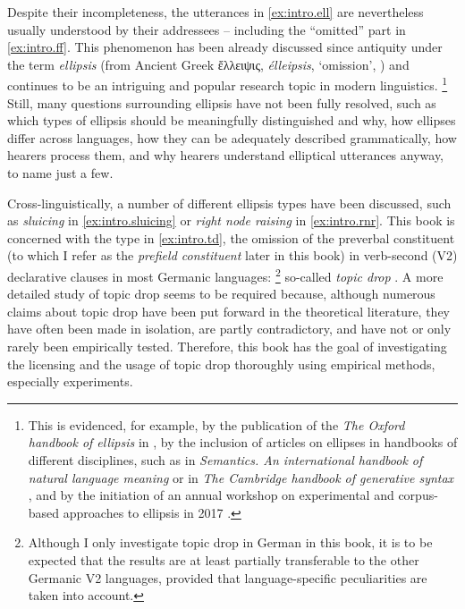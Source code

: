 Despite their incompleteness, the utterances in \ref{ex:intro.ell} are nevertheless usually understood by their addressees -- including the ``omitted'' part in \ref{ex:intro.ff}.
This phenomenon has been already discussed since antiquity under the term \textit{ellipsis} (from Ancient Greek ἔλλειψις, \textit{élleipsis}, `omission', \cite{ellipsis}) and continues to be an intriguing and popular research topic in modern linguistics.%
\footnote{This is evidenced, for example, by the publication of the \textit{The Oxford handbook of ellipsis} in \citeyear{vancraenenbroeck.temmerman2018.handbook} \citep{vancraenenbroeck.temmerman2018.handbook}, by the inclusion of articles on ellipses in handbooks of different disciplines, such as \citet{reich2011} in \textit{Semantics. An international handbook of natural language meaning} 
\citep{heusinger.etal2011} or \citet{vancraenenbroeck.merchant2013} in \textit{The Cambridge handbook of generative syntax} \citep{dikken2013}, and by the initiation of an annual workshop on experimental and corpus-based approaches to ellipsis in 2017 \citep[see][]{bilbiie.nykiel2023}.}
%
Still, many questions surrounding ellipsis have not been fully resolved, such as which types of ellipsis should be meaningfully distinguished and why, how ellipses differ across languages, how they can be adequately described grammatically, how hearers process them, and why hearers understand elliptical utterances anyway, to name just a few.

Cross-linguistically, a number of different ellipsis types have been discussed, such as \textit{sluicing}  \citep[e.g.,][]{ross1969,merchant2001} in \ref{ex:intro.sluicing} or \textit{right node raising} \citep[e.g.,][]{postal1974,hartmann2000} in \ref{ex:intro.rnr}.
This book is concerned with the type in \ref{ex:intro.td}, the omission of the preverbal constituent (to which I refer as the \textit{prefield constituent} later in this book) in verb-second (V2) declarative clauses in most Germanic languages:%
\footnote{Although I only investigate topic drop in German in this book, it is to be expected that the results are at least partially transferable to the other Germanic V2  languages, provided that language-specific peculiarities are taken into account.}%
%
 so-called \textit{topic drop} \citep[e.g.,][]{fries1988}.
A more detailed study of topic drop seems to be required because, although numerous claims about topic drop have been put forward in the theoretical literature, they have often been made in isolation, are partly contradictory, and have not or only rarely been empirically tested.
Therefore, this book has the goal of investigating the licensing and the usage of topic drop thoroughly using empirical methods, especially experiments.

